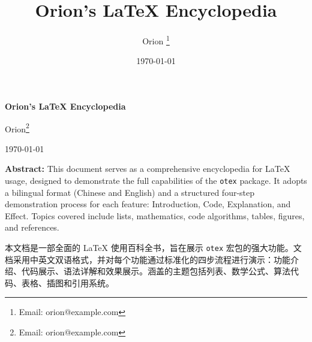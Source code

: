 \documentclass{article}
\title{Orion's LaTeX Encyclopedia \\ \large \zh{LaTeX 权威指南与百科全书}}
\author{Orion \thanks{Email: orion@example.com}}
\date{\today}
\begin{document}
\begin{titlepage}
  \centering
  \vspace*{\fill}

  {\Huge\bfseries Orion's LaTeX Encyclopedia \par}
  \vspace{0.5em}
  {\large {} \par}

  \vspace{2cm}
  {\Large Orion\footnote{Email: orion@example.com} \par}
  \vspace{0.5em}
  {\large \today \par}

  \vspace{3cm}
  \begin{minipage}{0.85\textwidth}
    \noindent \textbf{Abstract:} This document serves as a comprehensive encyclopedia for LaTeX usage, designed to demonstrate the full capabilities of the \texttt{otex} package. It adopts a bilingual format (Chinese and English) and a structured four-step demonstration process for each feature: Introduction, Code, Explanation, and Effect. Topics covered include lists, mathematics, code algorithms, tables, figures, and references.

    \vspace{0.5em}
    \noindent \textbf{} 本文档是一部全面的 LaTeX 使用百科全书，旨在展示 \texttt{otex} 宏包的强大功能。文档采用中英文双语格式，并对每个功能通过标准化的四步流程进行演示：功能介绍、代码展示、语法详解和效果展示。涵盖的主题包括列表、数学公式、算法代码、表格、插图和引用系统。
  \end{minipage}

  \vspace*{\fill}
\end{titlepage}

\newpage

\tableofcontents
\newpage



\newpage


\newpage


\newpage


\newpage


\newpage


\newpage
\printbibliography[heading=bibintoc]
\end{document}
